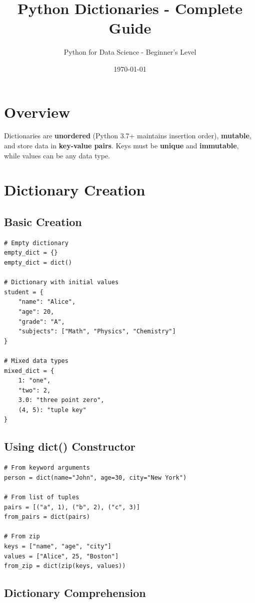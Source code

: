 \documentclass[12pt,a4paper]{article}
\title{\textbf{Python Dictionaries - Complete Guide}}
\author{Python for Data Science - Beginner's Level}
\date{\today}
\begin{document}
\maketitle
\tableofcontents
\newpage

\section{Overview}

Dictionaries are \textbf{unordered} (Python 3.7+ maintains insertion order), \textbf{mutable}, and store data in \textbf{key-value pairs}. Keys must be \textbf{unique} and \textbf{immutable}, while values can be any data type.

\section{Dictionary Creation}

\subsection{Basic Creation}

\begin{lstlisting}
# Empty dictionary
empty_dict = {}
empty_dict = dict()

# Dictionary with initial values
student = {
    "name": "Alice",
    "age": 20,
    "grade": "A",
    "subjects": ["Math", "Physics", "Chemistry"]
}

# Mixed data types
mixed_dict = {
    1: "one",
    "two": 2,
    3.0: "three point zero",
    (4, 5): "tuple key"
}
\end{lstlisting}

\subsection{Using dict() Constructor}

\begin{lstlisting}
# From keyword arguments
person = dict(name="John", age=30, city="New York")

# From list of tuples
pairs = [("a", 1), ("b", 2), ("c", 3)]
from_pairs = dict(pairs)

# From zip
keys = ["name", "age", "city"]
values = ["Alice", 25, "Boston"]
from_zip = dict(zip(keys, values))
\end{lstlisting}

\subsection{Dictionary Comprehension}
\end{document}
